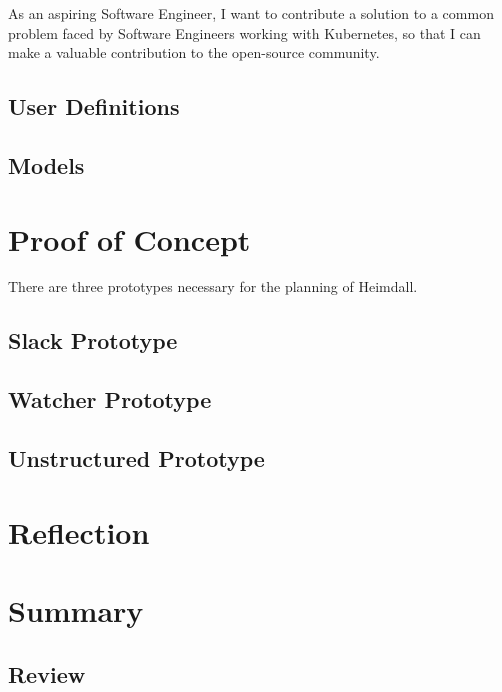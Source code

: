 \documentclass{article}
\begin{document}
As an aspiring Software Engineer, I want to contribute a solution to a common problem faced by Software Engineers working with Kubernetes, so that I can make a valuable contribution to the open-source community.



\subsection{User Definitions}



\subsection{Models}



\section{Proof of Concept}
There are three prototypes necessary for the planning of Heimdall. 

\subsection{Slack Prototype}

\subsection{Watcher Prototype}

\subsection{Unstructured Prototype} \label{unstructured-poc}

\section{Reflection}



\section{Summary}



\subsection{Review}
\end{document}
